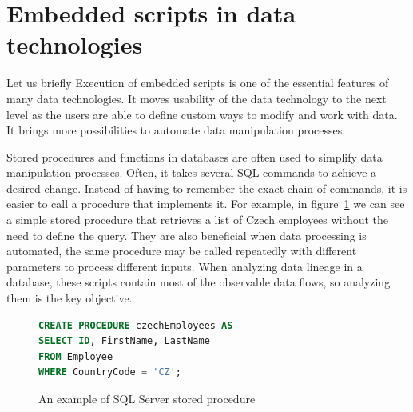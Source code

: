 \section{Embedded scripts in data technologies}
Let us briefly 
Execution of embedded scripts is one of the essential features of many data technologies. It moves usability of the data technology to the next level as the users are able to define custom ways to modify and work with data. It brings more possibilities to automate data manipulation processes.
\par
Stored procedures and functions in databases are often used to simplify data manipulation processes. Often, it takes several SQL commands to achieve a desired change. Instead of having to remember the exact chain of commands, it is easier to call a procedure that implements it. For example, in figure~\ref{fig:storedProcedure} we can see a simple stored procedure that retrieves a list of Czech employees without the need to define the query. They are also beneficial when data processing is automated, the same procedure may be called repeatedly with different parameters to process different inputs. When analyzing data lineage in a database, these scripts contain most of the observable data flows, so analyzing them is the key objective.
\begin{figure}[ht]
\begin{lstlisting}[language=SQL] 
CREATE PROCEDURE czechEmployees AS
SELECT ID, FirstName, LastName
FROM Employee
WHERE CountryCode = 'CZ';
\end{lstlisting}
\caption{An example of SQL Server stored procedure}
\label{fig:storedProcedure}
\end{figure}
\par
